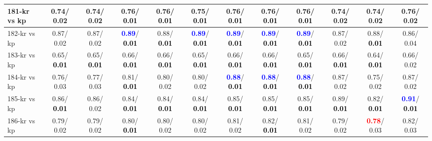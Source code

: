 \begin{table}[h]
\begin{center}
{\begin{tabular}{lc|c|c|c|c|c|c|c|c|c|c}
181-kr vs kp &   0.74/  0.02 &   0.74/  0.02 &   0.76/\textcolor{black}{\textbf{  0.01}} &   0.76/\textcolor{black}{\textbf{  0.01}} &   0.75/\textcolor{black}{\textbf{  0.01}} &   0.76/\textcolor{black}{\textbf{  0.01}} &   0.76/\textcolor{black}{\textbf{  0.01}} &   0.76/\textcolor{black}{\textbf{  0.01}} &   0.74/  0.02 &   0.74/  0.02 &   0.76/  0.02 \\ \hline
182-kr vs kp &   0.87/  0.02 &   0.87/  0.02 & \textcolor{blue}{\textbf{  0.89}}/\textcolor{black}{\textbf{  0.01}} &   0.88/\textcolor{black}{\textbf{  0.01}} & \textcolor{blue}{\textbf{  0.89}}/\textcolor{black}{\textbf{  0.01}} & \textcolor{blue}{\textbf{  0.89}}/\textcolor{black}{\textbf{  0.01}} & \textcolor{blue}{\textbf{  0.89}}/\textcolor{black}{\textbf{  0.01}} & \textcolor{blue}{\textbf{  0.89}}/\textcolor{black}{\textbf{  0.01}} &   0.87/  0.02 &   0.88/\textcolor{black}{\textbf{  0.01}} &   0.86/  0.04 \\
183-kr vs kp &   0.65/\textcolor{black}{\textbf{  0.01}} &   0.65/\textcolor{black}{\textbf{  0.01}} &   0.66/\textcolor{black}{\textbf{  0.01}} &   0.66/\textcolor{black}{\textbf{  0.01}} &   0.65/\textcolor{black}{\textbf{  0.01}} &   0.66/\textcolor{black}{\textbf{  0.01}} &   0.66/\textcolor{black}{\textbf{  0.01}} &   0.65/\textcolor{black}{\textbf{  0.01}} &   0.66/\textcolor{black}{\textbf{  0.01}} &   0.64/\textcolor{black}{\textbf{  0.01}} &   0.66/  0.02 \\
184-kr vs kp &   0.76/  0.03 &   0.77/  0.03 &   0.81/\textcolor{black}{\textbf{  0.01}} &   0.80/  0.02 &   0.80/  0.02 & \textcolor{blue}{\textbf{  0.88}}/\textcolor{black}{\textbf{  0.01}} & \textcolor{blue}{\textbf{  0.88}}/\textcolor{black}{\textbf{  0.01}} & \textcolor{blue}{\textbf{  0.88}}/\textcolor{black}{\textbf{  0.01}} &   0.87/  0.02 &   0.75/  0.02 &   0.87/  0.02 \\
185-kr vs kp &   0.86/\textcolor{black}{\textbf{  0.01}} &   0.86/  0.02 &   0.84/\textcolor{black}{\textbf{  0.01}} &   0.84/\textcolor{black}{\textbf{  0.01}} &   0.84/\textcolor{black}{\textbf{  0.01}} &   0.85/\textcolor{black}{\textbf{  0.01}} &   0.85/\textcolor{black}{\textbf{  0.01}} &   0.85/\textcolor{black}{\textbf{  0.01}} &   0.89/\textcolor{black}{\textbf{  0.01}} &   0.82/\textcolor{black}{\textbf{  0.01}} & \textcolor{blue}{\textbf{  0.91}}/\textcolor{black}{\textbf{  0.01}} \\
186-kr vs kp &   0.79/  0.02 &   0.79/  0.02 &   0.80/\textcolor{black}{\textbf{  0.01}} &   0.80/  0.02 &   0.80/  0.02 &   0.81/  0.02 &   0.82/\textcolor{black}{\textbf{  0.01}} &   0.81/  0.02 &   0.79/  0.02 & \textcolor{red}{\textbf{  0.78}}/  0.03 &   0.82/  0.03 \\

\end{tabular}}
\end{center}
\end{table}
